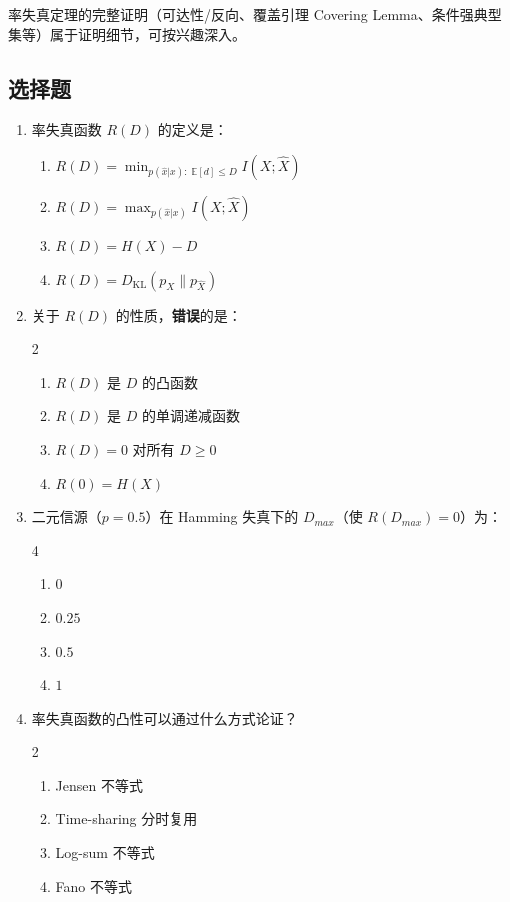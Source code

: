 \documentclass[12pt,a4paper]{ctexart}
\newcommand{\EE}{\mathbb{E}}
\newcommand{\DKL}{D_{\mathrm{KL}}}
\begin{document}
\begin{noteskipped}
率失真定理的完整证明（可达性/反向、覆盖引理 Covering Lemma、条件强典型集等）属于证明细节，可按兴趣深入。
\end{noteskipped}

\subsection*{选择题}

\begin{enumerate}[label=\arabic*., leftmargin=*]

\item 率失真函数 $R(D)$ 的定义是：
\begin{enumerate}[label=(\Alph*)]
  \item $R(D) = \displaystyle\min_{p(\hat{x}|x):\; \EE[d]\leq D} I(X;\hat{X})$
  \item $R(D) = \displaystyle\max_{p(\hat{x}|x)} I(X;\hat{X})$
  \item $R(D) = H(X) - D$
  \item $R(D) = \DKL(p_X\|p_{\hat{X}})$
\end{enumerate}

\item 关于 $R(D)$ 的性质，\textbf{错误}的是：
\begin{multicols}{2}
\begin{enumerate}[label=(\Alph*)]
  \item $R(D)$ 是 $D$ 的凸函数
  \item $R(D)$ 是 $D$ 的单调递减函数
  \item $R(D) = 0$ 对所有 $D \geq 0$
  \item $R(0) = H(X)$
\end{enumerate}
\end{multicols}

\item 二元信源（$p=0.5$）在 Hamming 失真下的 $D_{max}$（使 $R(D_{max})=0$）为：
\begin{multicols}{4}
\begin{enumerate}[label=(\Alph*)]
  \item $0$
  \item $0.25$
  \item $0.5$
  \item $1$
\end{enumerate}
\end{multicols}

\item 率失真函数的凸性可以通过什么方式论证？
\begin{multicols}{2}
\begin{enumerate}[label=(\Alph*)]
  \item Jensen 不等式
  \item Time-sharing 分时复用
  \item Log-sum 不等式
  \item Fano 不等式
\end{enumerate}
\end{multicols}


\end{enumerate}
\end{document}
